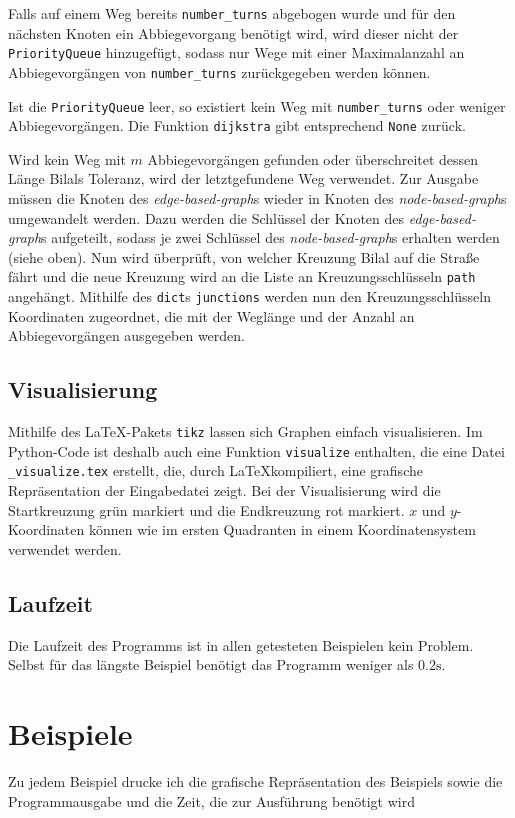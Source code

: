\documentclass[a4paper,10pt,ngerman]{scrartcl}
\begin{document}
Falls auf einem Weg bereits \texttt{number\_turns} abgebogen wurde und für den nächsten Knoten ein Abbiegevorgang benötigt wird, wird dieser nicht der \texttt{PriorityQueue} hinzugefügt, sodass nur Wege mit einer Maximalanzahl an Abbiegevorgängen von \texttt{number\_turns} zurückgegeben werden können.

Ist die \texttt{PriorityQueue} leer, so existiert kein Weg mit \texttt{number\_turns} oder weniger Abbiegevorgängen.
Die Funktion \texttt{dijkstra} gibt entsprechend \texttt{None} zurück.

Wird kein Weg mit $m$ Abbiegevorgängen gefunden oder überschreitet dessen Länge Bilals Toleranz, wird der letztgefundene Weg verwendet.
Zur Ausgabe müssen die Knoten des \textit{edge-based-graph}s wieder in Knoten des \textit{node-based-graph}s umgewandelt werden.
Dazu werden die Schlüssel der Knoten des \textit{edge-based-graph}s aufgeteilt, sodass je zwei Schlüssel des \textit{node-based-graph}s erhalten werden (siehe oben).
Nun wird überprüft, von welcher Kreuzung Bilal auf die Straße fährt und die neue Kreuzung wird an die Liste an Kreuzungsschlüsseln \texttt{path} angehängt.
Mithilfe des \texttt{dict}s \texttt{junctions} werden nun den Kreuzungsschlüsseln Koordinaten zugeordnet, die mit der Weglänge und der Anzahl an Abbiegevorgängen ausgegeben werden.

\subsection{Visualisierung}
Mithilfe des \LaTeX-Pakets \texttt{tikz} lassen sich Graphen einfach visualisieren.
Im Python-Code ist deshalb auch eine Funktion \texttt{visualize} enthalten, die eine Datei \texttt{\_visualize.tex} erstellt, die, durch \LaTeX kom\-pi\-liert, eine grafische Repräsentation der Eingabedatei zeigt.
Bei der Visualisierung wird die Startkreuzung grün markiert und die Endkreuzung rot markiert.
$x$ und $y$-Koordinaten können wie im ersten Quadranten in einem Koordinatensystem verwendet werden.

\subsection{Laufzeit}
Die Laufzeit des Programms ist in allen getesteten Beispielen kein Problem.
Selbst für das längste Beispiel benötigt das Programm weniger als $0.2 \textrm{s}$.

\section{Beispiele}
Zu jedem Beispiel drucke ich die grafische Repräsentation des Beispiels sowie die Programmausgabe und die Zeit, die zur Ausführung benötigt wird
\end{document}
